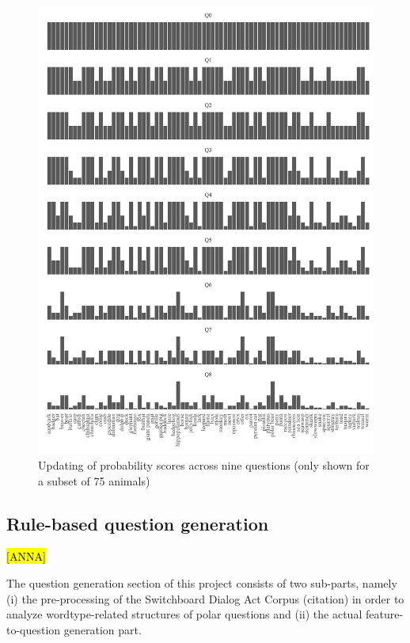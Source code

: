 \documentclass[11pt,a4paper]{article}
\begin{document}
\begin{figure}
	\includegraphics[width=\linewidth]{graphics/updating.pdf}
	\caption{Updating of probability scores across nine questions (only shown for a subset of 75 animals)}
	\label{fig:bayesian-update}
\end{figure}

\subsection{Rule-based question generation}
\label{subsec:qg}

\hl{[ANNA]}


The question generation section of this project consists of two sub-parts, namely (i) the pre-processing of the Switchboard Dialog Act Corpus (citation) in order to analyze wordtype-related structures of polar questions and (ii) the actual feature-to-question generation part. 
\end{document}

